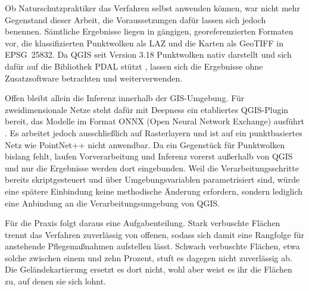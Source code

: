 Ob Naturschutzpraktiker das Verfahren selbst anwenden können, war nicht mehr
Gegenstand dieser Arbeit, die Voraussetzungen dafür lassen sich jedoch
benennen. Sämtliche Ergebnisse liegen in gängigen, georeferenzierten Formaten
vor, die klassifizierten Punktwolken als LAZ und die Karten als GeoTIFF in
EPSG~25832. Da QGIS seit Version 3.18 Punktwolken nativ darstellt und sich
dafür auf die Bibliothek PDAL stützt \cite{QGIS.318}, lassen sich die
Ergebnisse ohne Zusatzsoftware betrachten und weiterverwenden.

Offen bleibt allein die Inferenz innerhalb der GIS-Umgebung. Für
zweidimensionale Netze steht dafür mit Deepness ein etabliertes QGIS-Plugin
bereit, das Modelle im Format ONNX (Open Neural Network Exchange) ausführt
\cite{Aszkowski.2023}. Es arbeitet jedoch ausschließlich auf Rasterlayern und
ist auf ein punktbasiertes Netz wie PointNet++ nicht anwendbar. Da ein
Gegenstück für Punktwolken bislang fehlt, laufen Vorverarbeitung und Inferenz
vorerst außerhalb von QGIS und nur die Ergebnisse werden dort eingebunden.
Weil die Verarbeitungsschritte bereits skriptgesteuert und über
Umgebungsvariablen parametrisiert sind, würde eine spätere Einbindung
keine methodische Änderung erfordern, sondern lediglich eine Anbindung an die
Verarbeitungsumgebung von QGIS.

Für die Praxis folgt daraus eine Aufgabenteilung. Stark verbuschte Flächen
trennt das Verfahren zuverlässig von offenen, sodass sich damit eine Rangfolge
für anstehende Pflegemaßnahmen aufstellen lässt. Schwach verbuschte Flächen, etwa solche zwischen einem und zehn Prozent,
stuft es dagegen nicht zuverlässig ab. Die Geländekartierung ersetzt es dort nicht, wohl
aber weist es ihr die Flächen zu, auf denen sie sich lohnt.
